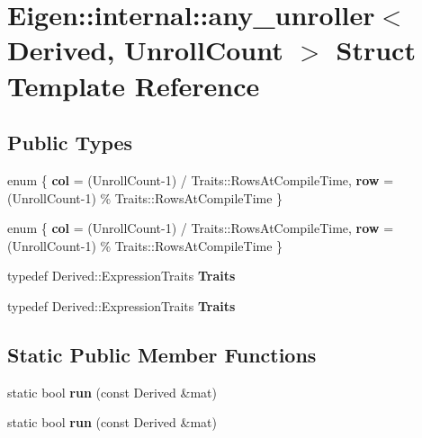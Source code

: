 \hypertarget{struct_eigen_1_1internal_1_1any__unroller}{}\section{Eigen\+:\+:internal\+:\+:any\+\_\+unroller$<$ Derived, Unroll\+Count $>$ Struct Template Reference}
\label{struct_eigen_1_1internal_1_1any__unroller}
\subsection*{Public Types}
\begin{DoxyCompactItemize}
\item 
\mbox{\label{struct_eigen_1_1internal_1_1any__unroller_abd95a7d63f2fa27efbd5bf74ddaff485}} 
enum \{ {\bfseries col} = (Unroll\+Count-\/1) / Traits\+:\+:Rows\+At\+Compile\+Time, 
{\bfseries row} = (Unroll\+Count-\/1) \% Traits\+:\+:Rows\+At\+Compile\+Time
 \}
\item 
\mbox{\label{struct_eigen_1_1internal_1_1any__unroller_a7f7fba4a93c7bcb9b18954886ff97fab}} 
enum \{ {\bfseries col} = (Unroll\+Count-\/1) / Traits\+:\+:Rows\+At\+Compile\+Time, 
{\bfseries row} = (Unroll\+Count-\/1) \% Traits\+:\+:Rows\+At\+Compile\+Time
 \}
\item 
\mbox{\label{struct_eigen_1_1internal_1_1any__unroller_a16eb27338e753255e5f97dda309b8aa9}} 
typedef Derived\+::\+Expression\+Traits {\bfseries Traits}
\item 
\mbox{\label{struct_eigen_1_1internal_1_1any__unroller_a16eb27338e753255e5f97dda309b8aa9}} 
typedef Derived\+::\+Expression\+Traits {\bfseries Traits}
\end{DoxyCompactItemize}
\subsection*{Static Public Member Functions}
\begin{DoxyCompactItemize}
\item 
\mbox{\label{struct_eigen_1_1internal_1_1any__unroller_a706f0aae20ca7a0633921d3219e12ca7}} 
static bool {\bfseries run} (const Derived \&mat)
\item 
\mbox{\label{struct_eigen_1_1internal_1_1any__unroller_a706f0aae20ca7a0633921d3219e12ca7}} 
static bool {\bfseries run} (const Derived \&mat)
\end{DoxyCompactItemize}


